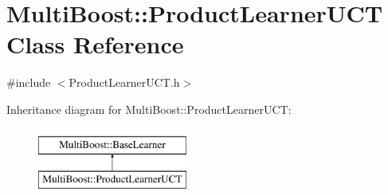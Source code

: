 \hypertarget{classMultiBoost_1_1ProductLearnerUCT}{
\section{MultiBoost::ProductLearnerUCT Class Reference}
\label{classMultiBoost_1_1ProductLearnerUCT}
}


{\ttfamily \#include $<$ProductLearnerUCT.h$>$}

Inheritance diagram for MultiBoost::ProductLearnerUCT:\begin{figure}[H]
\begin{center}
\leavevmode
\includegraphics[height=2.000000cm]{classMultiBoost_1_1ProductLearnerUCT}
\end{center}
\end{figure}
